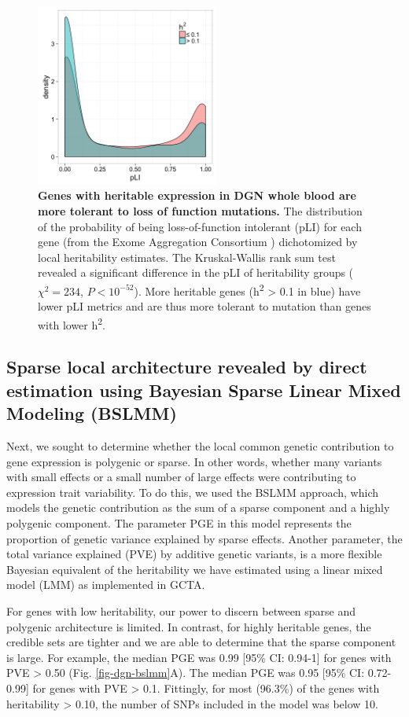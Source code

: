 \documentclass[10pt,letterpaper]{article}
\begin{document}
\begin{figure}[H]
\includegraphics[width=6cm]{Figures/pLI-by-h2.png}
\caption{{\bf Genes with heritable expression in DGN whole blood are more tolerant to loss of function mutations.} 
The distribution of the probability of being loss-of-function intolerant (pLI) for each gene (from the Exome Aggregation Consortium \cite{lek2016analysis}) dichotomized by local heritability estimates. The Kruskal-Wallis rank sum test revealed a significant difference in the pLI of heritability groups ($\chi^2 = 234$, $P < 10^{-52}$). More heritable genes (h\textsuperscript{2} \textgreater{} 0.1 in blue) have lower pLI metrics and are thus more tolerant to mutation than genes with lower h\textsuperscript{2}.
}
\label{fig-pli-h2}
\end{figure}


\subsection*{Sparse local architecture revealed by direct estimation using Bayesian Sparse Linear Mixed Modeling (BSLMM)}

Next, we sought to determine whether the local common genetic contribution to gene expression is polygenic or sparse. In other words, whether many variants with small effects or a small number of large effects were contributing to expression trait variability. To do this, we used the BSLMM \cite{Zhou_2013} approach, which models the genetic contribution as the sum of a sparse component and a highly polygenic component. The parameter PGE in this model represents the proportion of genetic variance explained by sparse effects. Another parameter, the total variance explained (PVE) by additive genetic variants, is a more flexible Bayesian equivalent of the heritability we have estimated using a linear mixed model (LMM) as implemented in GCTA. 

For genes with low heritability, our power to discern between sparse and polygenic architecture is limited. 
In contrast, for highly heritable genes, the credible sets are tighter and we are able to determine that the sparse component is large. For example, the median PGE was 0.99 [95\% CI: 0.94-1] for genes with PVE \textgreater{} 0.50 (Fig. \ref{fig-dgn-bslmm}A). The median PGE was 0.95 [95\% CI: 0.72-0.99] for genes with PVE \textgreater{} 0.1. Fittingly, for most (96.3\%) of the genes with heritability \textgreater{} 0.10, the number of SNPs included in the model was below 10.
\end{document}
